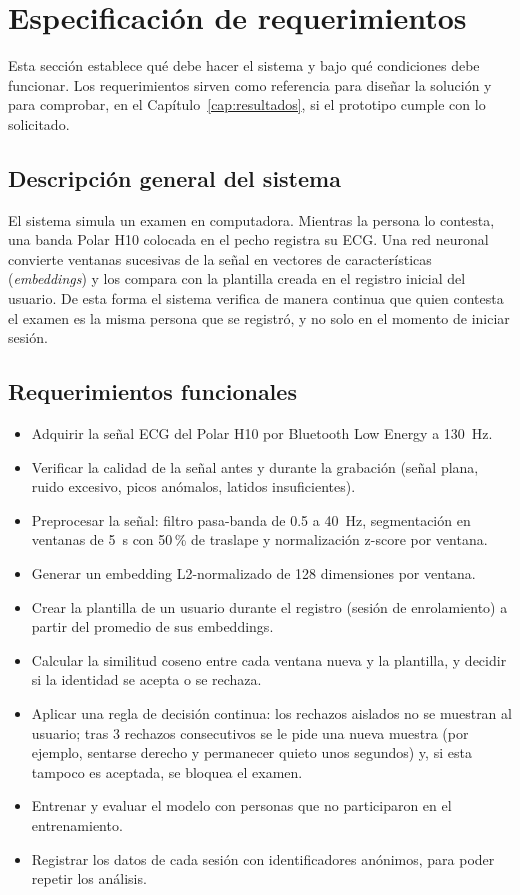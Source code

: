 \section{Especificación de requerimientos}
\label{sec:requerimientos}

Esta sección establece qué debe hacer el sistema y bajo qué condiciones debe funcionar. Los requerimientos sirven como referencia para diseñar la solución y para comprobar, en el Capítulo~\ref{cap:resultados}, si el prototipo cumple con lo solicitado.

\subsection{Descripción general del sistema}

El sistema simula un examen en computadora. Mientras la persona lo contesta, una banda Polar H10 colocada en el pecho registra su ECG. Una red neuronal convierte ventanas sucesivas de la señal en vectores de características (\emph{embeddings}) y los compara con la plantilla creada en el registro inicial del usuario. De esta forma el sistema verifica de manera continua que quien contesta el examen es la misma persona que se registró, y no solo en el momento de iniciar sesión.

\subsection{Requerimientos funcionales}

\begin{itemize}
  \item Adquirir la señal ECG del Polar H10 por Bluetooth Low Energy a 130~Hz.
  \item Verificar la calidad de la señal antes y durante la grabación (señal plana, ruido excesivo, picos anómalos, latidos insuficientes).
  \item Preprocesar la señal: filtro pasa-banda de 0.5 a 40~Hz, segmentación en ventanas de 5~s con 50\,\% de traslape y normalización z-score por ventana.
  \item Generar un embedding L2-normalizado de 128 dimensiones por ventana.
  \item Crear la plantilla de un usuario durante el registro (sesión de enrolamiento) a partir del promedio de sus embeddings.
  \item Calcular la similitud coseno entre cada ventana nueva y la plantilla, y decidir si la identidad se acepta o se rechaza.
  \item Aplicar una regla de decisión continua: los rechazos aislados no se muestran al usuario; tras 3 rechazos consecutivos se le pide una nueva muestra (por ejemplo, sentarse derecho y permanecer quieto unos segundos) y, si esta tampoco es aceptada, se bloquea el examen.
  \item Entrenar y evaluar el modelo con personas que no participaron en el entrenamiento.
  \item Registrar los datos de cada sesión con identificadores anónimos, para poder repetir los análisis.
\end{itemize}

